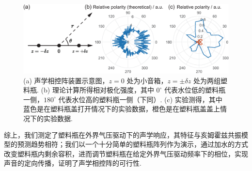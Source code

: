 \documentclass[a4paper, 10pt]{article}
\begin{document}
\begin{figure}[h]
    \centering
    \includegraphics[width=.8\columnwidth]{Phased-Bottle-Array.eps}
    \caption{(a) 声学相控阵装置示意图，$z=0$ 处为小音箱，$z=\pm\delta z$ 处为两组塑料瓶. (b) 理论计算所得相对极化强度，其中 $0^{\circ}$ 代表水位低的塑料瓶一侧，$180^{\circ}$ 代表水位高的塑料瓶一侧（下同）. (c) 实验测得，其中蓝色是在塑料瓶盖打开情况下的实验数据，橙色是在塑料瓶盖盖上情况下的实验数据.}
    \label{Phased-Bottle-Array}
\end{figure}

综上，我们测定了塑料瓶在外界气压驱动下的声学响应，其特征与亥姆霍兹共振模型的预测趋势相符；我们以一个十分简单的塑料瓶阵列作为演示，通过加水的方式改变塑料瓶内剩余容积，进而调节塑料瓶在给定外界气压驱动频率下的相位，实现声音的定向传播，证明了声学相控阵的可行性.

\nocite{*}


\end{document}
